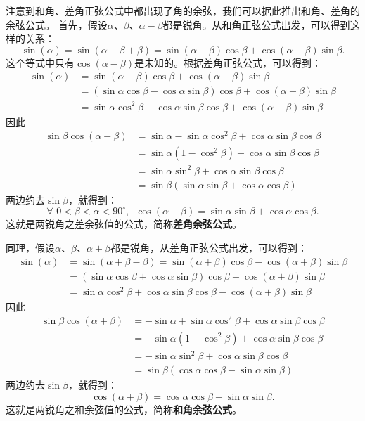 \documentclass[12pt,UTF8,fontset=none]{ctexbook}
\begin{document}
注意到和角、差角正弦公式中都出现了角的余弦，我们可以据此推出和角、差角的余弦公式。
首先，假设$\alpha$、$\beta$、$\alpha - \beta$都是锐角。从和角正弦公式出发，可以得到这样的关系：
$$ \sin(\alpha) = \sin(\alpha - \beta + \beta) = \sin (\alpha - \beta) \cos \beta + \cos(\alpha - \beta) \sin\beta.$$
这个等式中只有$\cos(\alpha - \beta)$是未知的。根据差角正弦公式，可以得到：
\begin{align*}
    \sin(\alpha) &= \sin (\alpha - \beta) \cos \beta + \cos(\alpha - \beta) \sin\beta  \\
    &= (\sin\alpha \cos \beta - \cos \alpha \sin\beta) \cos \beta + \cos(\alpha - \beta) \sin\beta  \\
    &= \sin\alpha \cos^2 \beta - \cos \alpha \sin\beta \cos \beta + \cos(\alpha - \beta) \sin\beta 
 \end{align*}
因此
\begin{align*}
    \sin\beta \cos(\alpha - \beta) &= \sin \alpha - \sin\alpha \cos^2 \beta + \cos \alpha \sin\beta \cos \beta  \\
    &= \sin \alpha (1 - \cos^2 \beta) + \cos \alpha \sin\beta \cos \beta  \\
    &= \sin\alpha \sin^2 \beta + \cos \alpha \sin\beta \cos \beta  \\
    &= \sin\beta (\sin\alpha \sin \beta +  \cos \alpha \cos \beta) 
 \end{align*}
两边约去$\sin \beta$，就得到：
$$ \forall \,\, 0 <  \beta < \alpha < 90^\circ , \,\,\, \cos(\alpha - \beta) = \sin\alpha \sin \beta +  \cos \alpha \cos \beta. $$
这就是两锐角之差余弦值的公式，简称\textbf{差角余弦公式}。

同理，假设$\alpha$、$\beta$、$\alpha + \beta$都是锐角，从差角正弦公式出发，可以得到：
\begin{align*}
      \sin(\alpha) &= \sin(\alpha + \beta - \beta) = \sin (\alpha + \beta) \cos \beta - \cos(\alpha + \beta) \sin\beta  \\
      &= (\sin\alpha \cos \beta + \cos \alpha \sin\beta) \cos \beta - \cos(\alpha + \beta) \sin\beta  \\
      &= \sin\alpha \cos^2 \beta + \cos \alpha \sin\beta \cos \beta - \cos(\alpha + \beta) \sin\beta  
 \end{align*}
因此
\begin{align*}
    \sin\beta \cos(\alpha + \beta)  &= -\sin \alpha + \sin\alpha \cos^2 \beta + \cos \alpha \sin\beta \cos \beta  \\
    &= -\sin \alpha (1 - \cos^2 \beta) + \cos \alpha \sin\beta \cos \beta  \\
    &= -\sin\alpha \sin^2 \beta + \cos \alpha \sin\beta \cos \beta  \\
    &= \sin\beta (\cos \alpha \cos \beta - \sin\alpha \sin \beta) 
 \end{align*}
两边约去$\sin \beta$，就得到：
$$  \cos(\alpha + \beta) = \cos \alpha \cos \beta - \sin\alpha \sin \beta. $$
这就是两锐角之和余弦值的公式，简称\textbf{和角余弦公式}。
\end{document}
